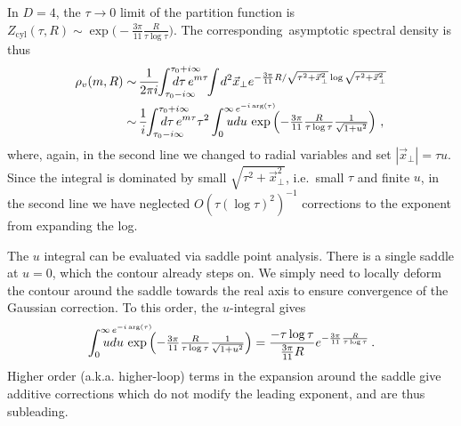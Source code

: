 \documentclass[
 reprint,
 amsmath,
 pre,
 amssymb,
 nofootinbib,
 aps,
 longbibliography,
]{revtex4-1}
\newcommand{\<}{{\langle}}
\renewcommand{\>}{{\rangle}}
\begin{document}
\subsection{}\label{app:rhosD=4}
In $D=4$, the $\tau\to 0$ limit of the partition function is $Z_{\text{cyl}}(\tau,R) \sim \exp\big(-\frac{3\pi}{11}\frac{R}{\tau \log \tau} \big)$.
The corresponding~asymptotic spectral density is thus
\begin{align}\label{eq:D=4transform}
    \rho_v( m,R) \sim &\, \frac{1}{2\pi i}\hspace{-3pt}\int_{\tau_0 - i\infty}^{\tau_0+i\infty} \hspace{-25pt}d\tau\, e^{ m \tau}\hspace{-3pt} \int \hspace{-1pt} d^{2}\vec x_\bot
    e^{-\frac{3\pi}{11}R/\sqrt{\tau^2+\vec x_\bot^2} \log \sqrt{\tau^2+\vec x_\bot^2}}\nonumber\\
     \sim&\, \frac{1}{i}\hspace{-3pt}\int_{\tau_0 - i\infty}^{\tau_0+i\infty} \hspace{-25pt}d\tau\, e^{ m \tau}
    \tau^2\int_0^{\infty \, e^{-i \arg(\tau) }} \hspace{-42pt} udu\,  \exp\left(-\tfrac{3\pi}{11}\tfrac{R}{\tau \log\tau}\tfrac{1}{\sqrt{1+u^2}}\right) \,,
\end{align}
where, again, in the second line we changed to radial variables and set $|\vec x_\bot|=\tau u$. Since the integral is dominated by small $\sqrt{\tau^2+\vec x_\bot^2}$, i.e.\ small $\tau$ and finite $u$, in the second line we have neglected $O(\tau(\log\tau)^2)^{-1}$ corrections to the exponent from expanding the log.

The $u$ integral can be evaluated via saddle point analysis. There is a single saddle at $u=0$, which the contour already steps on. We simply need to locally deform the contour around the saddle towards the real axis to ensure convergence of the Gaussian correction. To this order, the $u$-integral gives
\begin{equation}
	\int_0^{\infty \, e^{-i \arg(\tau) }} \hspace{-42pt} udu\,  \exp\left(-\tfrac{3\pi}{11}\tfrac{R}{\tau \log\tau}\tfrac{1}{\sqrt{1+u^2}}\right) = \frac{-\tau \log \tau}{\frac{3\pi}{11}R}e^{-\frac{3\pi}{11}\frac{R}{\tau \log\tau}}\,.
\end{equation}
Higher order (a.k.a. higher-loop) terms in the expansion around the saddle give additive corrections which do not modify the leading exponent, and are thus subleading.
\end{document}
